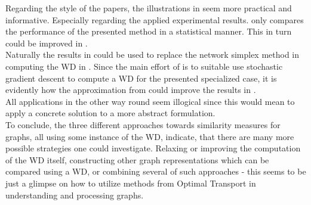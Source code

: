 \documentclass[twoside,twocolumn]{scrartcl}
\begin{document}
Regarding the style of the papers, the illustrations in \cite{B} seem more practical and informative. Especially regarding the applied experimental results. \cite{A} only compares the performance of the presented method in a statistical manner. This in turn could be improved in \cite{B}.\\

Naturally the results in \cite{C} could be used to replace the network simplex method in computing the WD in \cite{A}. Since the main effort of \cite{B} is to suitable use stochastic gradient descent to compute a WD for the presented specialized case, it is evidently how the approximation from \cite{C} could improve the results in \cite{B}.\\
All applications in the other way round seem illogical since this would mean to apply a concrete solution to a more abstract formulation.\\

To conclude, the three different approaches towards similarity measures for graphs, all using some instance of the WD, indicate, that there are many more possible strategies one could investigate. Relaxing or improving the computation of the WD itself, constructing other graph representations which can be compared using a WD, or combining several of such approaches - this seems to be just a glimpse on how to utilize methods from Optimal Transport in understanding and processing graphs.




\end{document}
